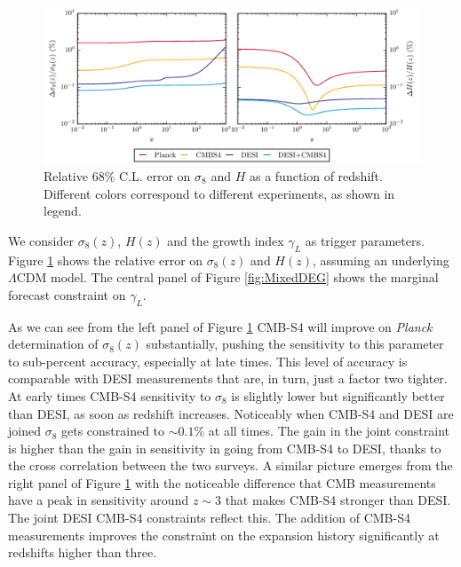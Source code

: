 \begin{figure}[!tb]
\begin{center}
\includegraphics[width=1.0\textwidth]{DarkEnergy/1_Thomographic}
\caption{Relative $68\%$ C.L. error on $\sigma_{8}$ and $H$ as a function of redshift. Different colors correspond to different experiments, as shown in legend.}\label{fig:GrowthExpansion}
\end{center}
\end{figure}

We consider $\sigma_8(z)$, $H(z)$ and the growth index $\gamma_{L}$ as trigger parameters. Figure \ref{fig:GrowthExpansion} shows the relative error on $\sigma_8(z)$ and $H(z)$, assuming an underlying $\Lambda$CDM model. The central panel of Figure \ref{fig:MixedDEG} shows the marginal forecast constraint on $\gamma_{L}$. 

As we can see from the left panel of Figure \ref{fig:GrowthExpansion} CMB-S4 will improve on {\it Planck} determination of $\sigma_{8}(z)$ substantially, pushing the sensitivity to this parameter to sub-percent accuracy, especially at late times. 
This level of accuracy is comparable with DESI measurements that are, in turn, just a factor two tighter.
At early times CMB-S4 sensitivity to $\sigma_{8}$ is slightly lower but significantly better than DESI, as soon as redshift increases.
Noticeably when CMB-S4 and DESI are joined $\sigma_{8}$ gets constrained to $\sim 0.1\%$ at all times. The gain in the joint constraint is higher than the gain in sensitivity in going from CMB-S4 to DESI, thanks to the cross correlation between the two surveys.
%
A similar picture emerges from the right panel of Figure \ref{fig:GrowthExpansion} with the noticeable difference that CMB measurements have a peak in sensitivity around $z\sim 3$ that makes CMB-S4 stronger than DESI. The joint DESI CMB-S4 constraints reflect this. The addition of CMB-S4 measurements improves the constraint on the expansion history significantly at redshifts higher than three.

